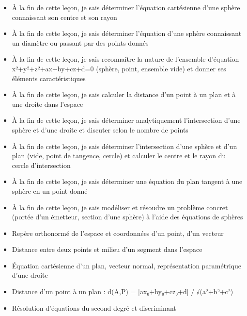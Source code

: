 \documentclass[11pt]{article}
\begin{document}
\begin{objectifs}
\begin{itemize}
\item À la fin de cette leçon, je sais déterminer l'équation cartésienne d'une sphère connaissant son centre et son rayon
\item À la fin de cette leçon, je sais déterminer l'équation d'une sphère connaissant un diamètre ou passant par des points donnés
\item À la fin de cette leçon, je sais reconnaître la nature de l'ensemble d'équation x²+y²+z²+ax+by+cz+d=0 (sphère, point, ensemble vide) et donner ses éléments caractéristiques
\item À la fin de cette leçon, je sais calculer la distance d'un point à un plan et à une droite dans l'espace
\item À la fin de cette leçon, je sais déterminer analytiquement l'intersection d'une sphère et d'une droite et discuter selon le nombre de points
\item À la fin de cette leçon, je sais déterminer l'intersection d'une sphère et d'un plan (vide, point de tangence, cercle) et calculer le centre et le rayon du cercle d'intersection
\item À la fin de cette leçon, je sais déterminer une équation du plan tangent à une sphère en un point donné
\item À la fin de cette leçon, je sais modéliser et résoudre un problème concret (portée d'un émetteur, section d'une sphère) à l'aide des équations de sphères
\end{itemize}
\end{objectifs}

\begin{prerequis}
\begin{itemize}
\item Repère orthonormé de l'espace et coordonnées d'un point, d'un vecteur
\item Distance entre deux points et milieu d'un segment dans l'espace
\item Équation cartésienne d'un plan, vecteur normal, représentation paramétrique d'une droite
\item Distance d'un point à un plan : d(A,P) = |ax₀+by₀+cz₀+d| / √(a²+b²+c²)
\item Résolution d'équations du second degré et discriminant
\end{itemize}
\end{prerequis}

\newpage
\end{document}
